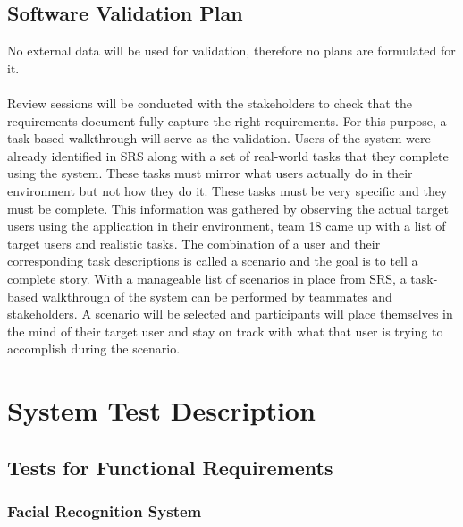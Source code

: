 \documentclass[12pt, titlepage]{article}
\begin{document}
\newpage

\subsection{Software Validation Plan}

No external data will be used for validation, therefore no plans are formulated for it.\\
\\
\noindent Review sessions will be conducted with the stakeholders to check that the requirements document fully capture the right requirements. For this purpose, a task-based walkthrough will serve as the validation. Users of the system were already identified in SRS along with a set of real-world tasks that they complete using the system. These tasks must mirror what users actually do in their environment but not how they do it. These tasks must be very specific and they must be complete. This information was gathered by observing the actual target users using the application in their environment, team 18 came up with a list of target users and realistic tasks. The combination of a user and their corresponding task descriptions is called a scenario and the goal is to tell a complete story.
With a manageable list of scenarios in place from SRS, a task-based walkthrough of the system can be performed by teammates and stakeholders. A scenario will be selected and participants will
place themselves in the mind of their target user and stay on track with what that user is trying to accomplish during the scenario. 


\section{System Test Description}
	
\subsection{Tests for Functional Requirements}

\subsubsection{Facial Recognition System}
		
\end{document}
